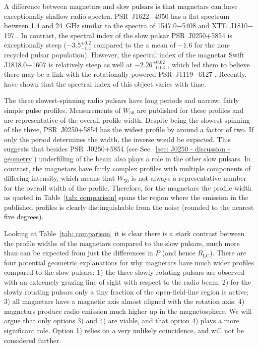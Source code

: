 A difference between magnetars and slow pulsars is that magnetars can have exceptionally shallow radio spectra. PSR~J1622$-$4950 has a flat spectrum between 1.4 and 24~GHz \citep{KJLB2011} similar to the spectra of 1547.0$-$5408 and XTE~J1810$-$197 \citep{CRJ+2007b, CRHR2007a, KSJ+2007}. In contrast, the spectral index of the slow pulsar PSR~J0250+5854 is exceptionally steep ($-3.5^{+0.2}_{-1.4}$ compared to the a mean of $-1.6$ for the non-recycled pulsar population). However, the spectral index of the magnetar Swift J1818.0$-$1607 is relatively steep as well at $-2.26^{+0.02}_{-0.03}$ \citep{LSJB2020}, which led them to believe there may be a link with the rotationally-powered PSR~J1119$-$6127 \citep[e.g][]{MPD+2017,DJW+2018}. Recently, \citet{CCC+2020} have shown that the spectral index of this object varies with time. 

The three slowest-spinning radio pulsars have long periods and narrow, fairly simple pulse profiles. Measurements of $W_{50}$ are published for these profiles and are representative of the overall profile width. Despite being the slowest-spinning of the three, PSR~J0250+5854 has the widest profile by around a factor of two. If only the period determines the width, the inverse would be expected. This suggests that besides PSR~J0250+5854 (see Sec.~\ref{sec: J0250 - discussion - geometry}) underfilling of the beam also plays a role in the other slow pulsars. In contrast, the magnetars have fairly complex profiles with multiple components of differing intensity, which means that $W_{50}$ is not always a representative number for the overall width of the profile. Therefore, for the magnetars the profile width as quoted in Table~\ref{tab: comparison} spans the region where the emission in the published profiles is clearly distinguishable from the noise (rounded to the nearest five degrees).

Looking at Table~\ref{tab: comparison} it is clear there is a stark contrast between the profile widths of the magnetars compared to the slow pulsars, much more than can be expected from just the differences in $P$ (and hence $R_\mathrm{LC}$). There are four potential geometric explanations for why magnetars have much wider profiles compared to the slow pulsars: 1) the three slowly rotating pulsars are observed with an extremely grazing line of sight with respect to the radio beam; 2) for the slowly rotating pulsars only a tiny fraction of the open-field-line region is active; 3) all magnetars have a magnetic axis almost aligned with the rotation axis; 4) magnetars produce radio emission much higher up in the magnetosphere. We will argue that only options 3) and 4) are viable, and that option 4) plays a more significant role. Option 1) relies on a very unlikely coincidence, and will not be considered further. 

